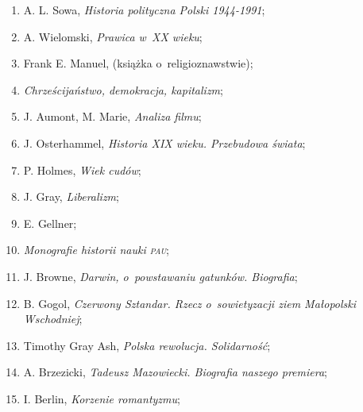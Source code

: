 \documentclass[a4paper,11pt]{article}
\begin{document}
\begin{enumerate}
\item A. L. Sowa, \textit{Historia polityczna Polski 1944-1991};



\item A. Wielomski, \textit{Prawica w~XX wieku};



\item Frank E. Manuel, (książka o~religioznawstwie);



\item \textit{Chrześcijaństwo, demokracja, kapitalizm};



\item J. Aumont, M. Marie, \textit{Analiza filmu};



\item J. Osterhammel, \textit{Historia XIX wieku. Przebudowa świata};



\item P. Holmes, \textit{Wiek cudów};



\item J. Gray, \textit{Liberalizm};



\item E. Gellner;



\item \textit{Monografie historii nauki \textsc{pau}};



\item J. Browne, \textit{Darwin, o~powstawaniu gatunków. Biografia};



\item B. Gogol, \textit{Czerwony Sztandar. Rzecz o~sowietyzacji ziem
    Małopolski Wschodniej};



\item Timothy Gray Ash, \textit{Polska rewolucja. Solidarność};



\item A. Brzezicki, \textit{Tadeusz Mazowiecki. Biografia naszego
    premiera};



\item I. Berlin, \textit{Korzenie romantyzmu};




\end{enumerate}
\end{document}
